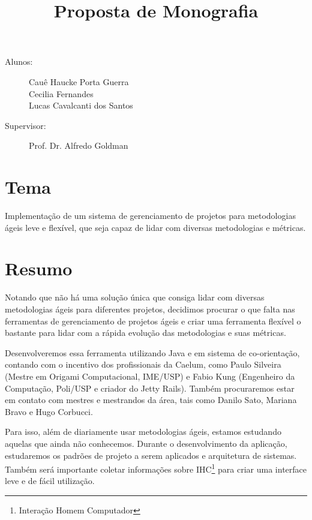\documentclass[titlepage]{article}
\title{Proposta de Monografia}
\author{}
\begin{document}
\maketitle

\begin{description} 
\item[Alunos:]Cauê Haucke Porta Guerra\\Cecilia Fernandes\\Lucas Cavalcanti dos Santos
\item[Supervisor: ] Prof. Dr. Alfredo Goldman
\end{description}

\section{Tema}
Implementação de um sistema de gerenciamento de projetos para metodologias ágeis leve e flexível, que seja capaz de lidar com diversas metodologias e métricas.


\section{Resumo}
Notando que não há uma solução única que consiga lidar com diversas metodologias ágeis para diferentes projetos, decidimos procurar o que falta nas ferramentas de gerenciamento de projetos ágeis e criar uma ferramenta flexível o bastante para lidar com a rápida evolução das metodologias e suas métricas.

Desenvolveremos essa ferramenta utilizando Java e em sistema de co-orientação, contando com o incentivo dos profissionais da Caelum, como Paulo Silveira (Mestre em Origami Computacional, IME/USP) e Fabio Kung (Engenheiro da Computação, Poli/USP e criador do Jetty Rails). Também procuraremos estar em contato com mestres e mestrandos da área, tais como Danilo Sato, Mariana Bravo e Hugo Corbucci.

Para isso, além de diariamente usar metodologias ágeis, estamos estudando aquelas que ainda não conhecemos. Durante o desenvolvimento da aplicação, estudaremos os padrões de projeto a serem aplicados e arquitetura de sistemas. Também será importante coletar informações sobre IHC\footnote{Interação Homem Computador} para criar uma interface leve e de fácil utilização.
\end{document}
